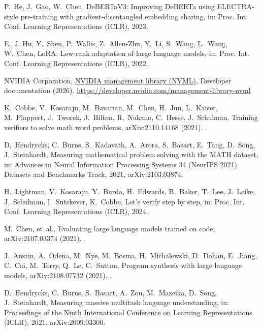 \documentclass[final,5p,times,twocolumn]{elsarticle}
\theoremstyle{plain}
\begin{document}
P.~He, J.~Gao, W.~Chen, {DeBERTaV3}: Improving {DeBERTa} using {ELECTRA}-style
  pre-training with gradient-disentangled embedding sharing, in: Proc. Int.
  Conf. Learning Representations (ICLR), 2023.

E.~J. Hu, Y.~Shen, P.~Wallis, Z.~Allen-Zhu, Y.~Li, S.~Wang, L.~Wang, W.~Chen,
  {LoRA}: Low-rank adaptation of large language models, in: Proc. Int. Conf.
  Learning Representations (ICLR), 2022.

{NVIDIA Corporation},
  \href{https://developer.nvidia.com/management-library-nvml}{{NVIDIA}
  management library ({NVML})}, Developer documentation (2026).
\newline\urlprefix\url{https://developer.nvidia.com/management-library-nvml}

K.~Cobbe, V.~Kosaraju, M.~Bavarian, M.~Chen, H.~Jun, L.~Kaiser, M.~Plappert,
  J.~Tworek, J.~Hilton, R.~Nakano, C.~Hesse, J.~Schulman, Training verifiers to
  solve math word problems, arXiv:2110.14168 (2021).
\newblock \href {http://arxiv.org/abs/2110.14168} {}.

D.~Hendrycks, C.~Burns, S.~Kadavath, A.~Arora, S.~Basart, E.~Tang, D.~Song,
  J.~Steinhardt, Measuring mathematical problem solving with the {MATH}
  dataset, in: Advances in Neural Information Processing Systems 34 (NeurIPS
  2021) Datasets and Benchmarks Track, 2021, arXiv:2103.03874.

H.~Lightman, V.~Kosaraju, Y.~Burda, H.~Edwards, B.~Baker, T.~Lee, J.~Leike,
  J.~Schulman, I.~Sutskever, K.~Cobbe, Let's verify step by step, in: Proc.
  Int. Conf. Learning Representations (ICLR), 2024.

M.~Chen, et~al., Evaluating large language models trained on code,
  arXiv:2107.03374 (2021).
\newblock \href {http://arxiv.org/abs/2107.03374} {}.

J.~Austin, A.~Odena, M.~Nye, M.~Bosma, H.~Michalewski, D.~Dohan, E.~Jiang,
  C.~Cai, M.~Terry, Q.~Le, C.~Sutton, Program synthesis with large language
  models, arXiv:2108.07732 (2021).
\newblock \href {http://arxiv.org/abs/2108.07732} {}.

D.~Hendrycks, C.~Burns, S.~Basart, A.~Zou, M.~Mazeika, D.~Song, J.~Steinhardt,
  Measuring massive multitask language understanding, in: Proceedings of the
  Ninth International Conference on Learning Representations (ICLR), 2021,
  arXiv:2009.03300.
\end{document}
